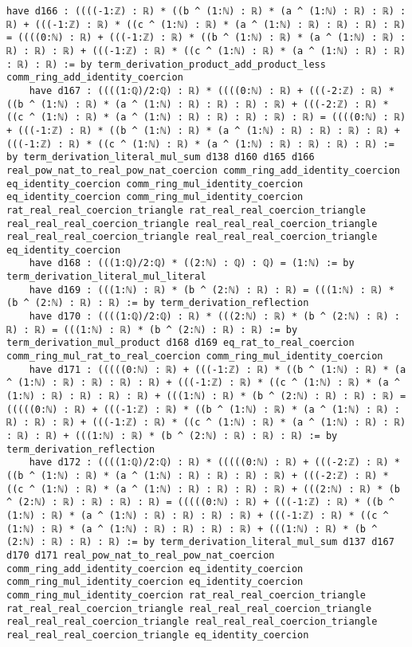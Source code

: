 \documentclass{article}
\begin{document}
\begin{tcolorbox}[colback=white!10, width=\linewidth]
\begin{lstlisting}[language=Lean4]
    have d166 : ((((-1:ℤ) : ℝ) * ((b ^ (1:ℕ) : ℝ) * (a ^ (1:ℕ) : ℝ) : ℝ) : ℝ) + (((-1:ℤ) : ℝ) * ((c ^ (1:ℕ) : ℝ) * (a ^ (1:ℕ) : ℝ) : ℝ) : ℝ) : ℝ) = ((((0:ℕ) : ℝ) + (((-1:ℤ) : ℝ) * ((b ^ (1:ℕ) : ℝ) * (a ^ (1:ℕ) : ℝ) : ℝ) : ℝ) : ℝ) + (((-1:ℤ) : ℝ) * ((c ^ (1:ℕ) : ℝ) * (a ^ (1:ℕ) : ℝ) : ℝ) : ℝ) : ℝ) := by term_derivation_product_add_product_less comm_ring_add_identity_coercion
    have d167 : ((((1:ℚ)/2:ℚ) : ℝ) * ((((0:ℕ) : ℝ) + (((-2:ℤ) : ℝ) * ((b ^ (1:ℕ) : ℝ) * (a ^ (1:ℕ) : ℝ) : ℝ) : ℝ) : ℝ) + (((-2:ℤ) : ℝ) * ((c ^ (1:ℕ) : ℝ) * (a ^ (1:ℕ) : ℝ) : ℝ) : ℝ) : ℝ) : ℝ) = ((((0:ℕ) : ℝ) + (((-1:ℤ) : ℝ) * ((b ^ (1:ℕ) : ℝ) * (a ^ (1:ℕ) : ℝ) : ℝ) : ℝ) : ℝ) + (((-1:ℤ) : ℝ) * ((c ^ (1:ℕ) : ℝ) * (a ^ (1:ℕ) : ℝ) : ℝ) : ℝ) : ℝ) := by term_derivation_literal_mul_sum d138 d160 d165 d166 real_pow_nat_to_real_pow_nat_coercion comm_ring_add_identity_coercion eq_identity_coercion comm_ring_mul_identity_coercion eq_identity_coercion comm_ring_mul_identity_coercion rat_real_real_coercion_triangle rat_real_real_coercion_triangle real_real_real_coercion_triangle real_real_real_coercion_triangle real_real_real_coercion_triangle real_real_real_coercion_triangle eq_identity_coercion
    have d168 : (((1:ℚ)/2:ℚ) * ((2:ℕ) : ℚ) : ℚ) = (1:ℕ) := by term_derivation_literal_mul_literal
    have d169 : (((1:ℕ) : ℝ) * (b ^ (2:ℕ) : ℝ) : ℝ) = (((1:ℕ) : ℝ) * (b ^ (2:ℕ) : ℝ) : ℝ) := by term_derivation_reflection
    have d170 : ((((1:ℚ)/2:ℚ) : ℝ) * (((2:ℕ) : ℝ) * (b ^ (2:ℕ) : ℝ) : ℝ) : ℝ) = (((1:ℕ) : ℝ) * (b ^ (2:ℕ) : ℝ) : ℝ) := by term_derivation_mul_product d168 d169 eq_rat_to_real_coercion comm_ring_mul_rat_to_real_coercion comm_ring_mul_identity_coercion
    have d171 : (((((0:ℕ) : ℝ) + (((-1:ℤ) : ℝ) * ((b ^ (1:ℕ) : ℝ) * (a ^ (1:ℕ) : ℝ) : ℝ) : ℝ) : ℝ) + (((-1:ℤ) : ℝ) * ((c ^ (1:ℕ) : ℝ) * (a ^ (1:ℕ) : ℝ) : ℝ) : ℝ) : ℝ) + (((1:ℕ) : ℝ) * (b ^ (2:ℕ) : ℝ) : ℝ) : ℝ) = (((((0:ℕ) : ℝ) + (((-1:ℤ) : ℝ) * ((b ^ (1:ℕ) : ℝ) * (a ^ (1:ℕ) : ℝ) : ℝ) : ℝ) : ℝ) + (((-1:ℤ) : ℝ) * ((c ^ (1:ℕ) : ℝ) * (a ^ (1:ℕ) : ℝ) : ℝ) : ℝ) : ℝ) + (((1:ℕ) : ℝ) * (b ^ (2:ℕ) : ℝ) : ℝ) : ℝ) := by term_derivation_reflection
    have d172 : ((((1:ℚ)/2:ℚ) : ℝ) * (((((0:ℕ) : ℝ) + (((-2:ℤ) : ℝ) * ((b ^ (1:ℕ) : ℝ) * (a ^ (1:ℕ) : ℝ) : ℝ) : ℝ) : ℝ) + (((-2:ℤ) : ℝ) * ((c ^ (1:ℕ) : ℝ) * (a ^ (1:ℕ) : ℝ) : ℝ) : ℝ) : ℝ) + (((2:ℕ) : ℝ) * (b ^ (2:ℕ) : ℝ) : ℝ) : ℝ) : ℝ) = (((((0:ℕ) : ℝ) + (((-1:ℤ) : ℝ) * ((b ^ (1:ℕ) : ℝ) * (a ^ (1:ℕ) : ℝ) : ℝ) : ℝ) : ℝ) + (((-1:ℤ) : ℝ) * ((c ^ (1:ℕ) : ℝ) * (a ^ (1:ℕ) : ℝ) : ℝ) : ℝ) : ℝ) + (((1:ℕ) : ℝ) * (b ^ (2:ℕ) : ℝ) : ℝ) : ℝ) := by term_derivation_literal_mul_sum d137 d167 d170 d171 real_pow_nat_to_real_pow_nat_coercion comm_ring_add_identity_coercion eq_identity_coercion comm_ring_mul_identity_coercion eq_identity_coercion comm_ring_mul_identity_coercion rat_real_real_coercion_triangle rat_real_real_coercion_triangle real_real_real_coercion_triangle real_real_real_coercion_triangle real_real_real_coercion_triangle real_real_real_coercion_triangle eq_identity_coercion

\end{lstlisting}
\end{tcolorbox}
\end{document}
